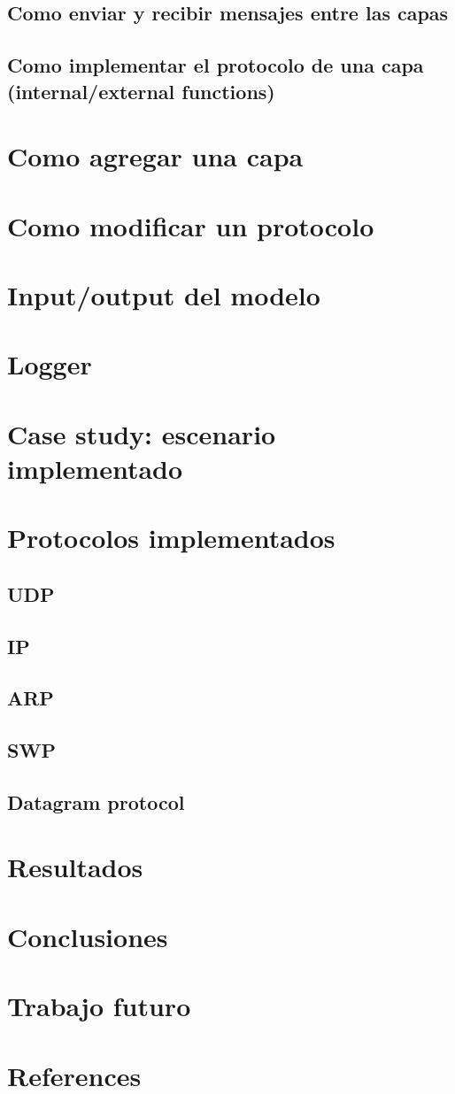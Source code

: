 \documentclass[10pt,a4paper]{article}
\begin{document}
\subsection{Como enviar y recibir mensajes entre las capas}
\subsection{Como implementar el protocolo de una capa (internal/external functions)}
\section{Como agregar una capa}
\section{Como modificar un protocolo}
\section{Input/output del modelo}
\section{Logger}
\section{Case study: escenario implementado}
\section{Protocolos implementados}
\subsection{UDP}
\subsection{IP}
\subsection{ARP}
\subsection{SWP}
\subsection{Datagram protocol}
\section{Resultados}
\section{Conclusiones}
\section{Trabajo futuro}
\section{References}


\end{document}

